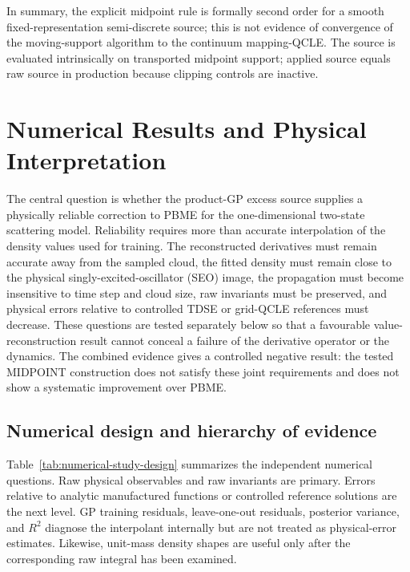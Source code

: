 \documentclass[
  11pt,
  letterpaper,
  onehalfspacing,
  normalmargins,
  equalmargins,
  oneside
]{ut-thesis}
\begin{document}
In summary, the explicit midpoint rule is formally second order for a smooth
fixed-representation semi-discrete source; this is not evidence of convergence
of the moving-support algorithm to the continuum
mapping-QCLE.  The source is evaluated intrinsically on transported midpoint
support; applied source equals raw source in production because clipping
controls are inactive.

\chapter{Numerical Results and Physical Interpretation}
\label{chap:results}

The central question is whether the product-GP excess source supplies a
physically reliable correction to PBME for the one-dimensional two-state
scattering model. Reliability requires more than accurate interpolation of
the density values used for training. The reconstructed derivatives must
remain accurate away from the sampled cloud, the fitted density must remain
close to the physical singly-excited-oscillator (SEO) image, the propagation
must become insensitive to time step and cloud size, raw invariants must be
preserved, and physical errors relative to controlled TDSE or grid-QCLE
references must decrease. These questions are tested separately below so that
a favourable value-reconstruction result cannot conceal a failure of the
derivative operator or the dynamics. The combined evidence gives a controlled
negative result: the tested MIDPOINT construction does not satisfy these joint
requirements and does not show a systematic improvement over PBME.

\section{Numerical design and hierarchy of evidence}
\label{sec:results-design}

Table~\ref{tab:numerical-study-design} summarizes the independent numerical
questions. Raw physical observables and raw invariants are primary. Errors
relative to analytic manufactured functions or controlled reference solutions
are the next level. GP training residuals, leave-one-out residuals, posterior
variance, and \(R^2\) diagnose the interpolant internally but are not treated
as physical-error estimates. Likewise, unit-mass density shapes are useful
only after the corresponding raw integral has been examined.
\end{document}
